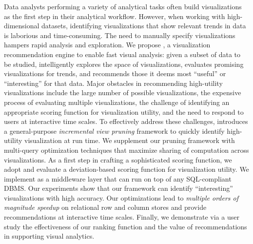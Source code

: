 Data analysts performing a variety of analytical tasks often build visualizations
as the first step in their analytical workflow.
However, when working with high-dimensional datasets, identifying visualizations
that show relevant trends in data is laborious and time-consuming.
The need to manually specify visualizations hampers rapid analysis and exploration.
We propose \SeeDB, a visualization recommendation engine to enable fast 
visual analysis: 
given a subset of data to be studied, \SeeDB intelligently explores the 
space of visualizations, evaluates promising visualizations for trends, and 
recommends those it 
deems most ``useful'' or ``interesting'' for that data.
Major obstacles in recommending high-utility visualizations include the large number of possible 
visualizations, the expensive process of evaluating multiple visualizations, the
challenge of identifying an appropriate scoring function for visualization utility, and 
the need to respond to users at interactive time scales.
To effectively address these challenges, \SeeDB introduces a general-purpose {\em incremental 
view pruning}
framework to quickly identify high-utility visualization at run time.
We supplement our pruning framework with multi-query optimization techniques that maximize 
sharing of computation across visualizations.
As a first step in crafting a sophisticated scoring function, we adopt and evaluate a 
deviation-based scoring function for visualization 
utility.
We implement \SeeDB as a middleware layer that can run on top of any SQL-compliant DBMS. 
Our experiments show that our framework can identify ``interesting'' visualizations with high accuracy. 
Our optimizations lead to 
{\em multiple orders of magnitude speedup} on relational row and column stores and provide
recommendations at interactive time scales.
Finally, we demonstrate via a user study the effectiveness of our ranking function
and the value of recommendations in supporting visual analytics. 
